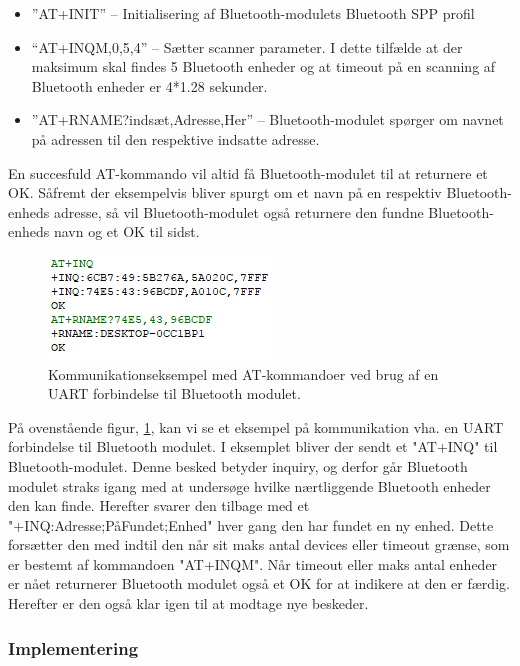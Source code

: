 \begin{itemize}
	\item ”AT+INIT” – Initialisering af Bluetooth-modulets Bluetooth SPP profil
	\item “AT+INQM,0,5,4” – Sætter scanner parameter. I dette tilfælde at der maksimum skal findes 5 Bluetooth enheder og at timeout på en scanning af Bluetooth enheder er 4*1.28 sekunder.
	\item ”AT+RNAME?indsæt,Adresse,Her” – Bluetooth-modulet spørger om navnet på adressen til den respektive indsatte adresse.
\end{itemize}

En succesfuld AT-kommando vil altid få Bluetooth-modulet til at returnere et OK. Såfremt der eksempelvis bliver spurgt om et navn på en respektiv Bluetooth-enheds adresse, så vil Bluetooth-modulet også returnere den fundne Bluetooth-enheds navn og et OK til sidst. 

\begin{figure}[H]
	\centering
	\includegraphics[width = 200 pt]{Img/uart_eksempel.PNG}
	\caption{Kommunikationseksempel med AT-kommandoer ved brug af en UART forbindelse til Bluetooth modulet.}
	\label{fig:UART_eksempel}
\end{figure}

På ovenstående figur,  \ref{fig:UART_eksempel}, kan vi se et eksempel på kommunikation vha. en UART forbindelse til Bluetooth modulet. I eksemplet bliver der sendt et "AT+INQ"  til Bluetooth-modulet. Denne besked betyder inquiry, og derfor går Bluetooth modulet straks igang med at undersøge hvilke nærtliggende Bluetooth enheder den kan finde. Herefter svarer den tilbage med et "+INQ:Adresse;PåFundet;Enhed" hver gang den har fundet en ny enhed. Dette forsætter den med indtil den når sit maks antal devices eller timeout grænse, som er bestemt af kommandoen "AT+INQM". Når timeout eller maks antal enheder er nået returnerer Bluetooth modulet også et OK for at indikere at den er færdig. Herefter er den også klar igen til at modtage nye beskeder.

\subsubsection{Implementering}

